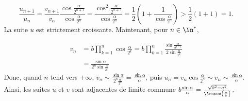 {{$$\frac{u_{n+1}}{u_n}=\frac{v_{n+1}}{v_n}\frac{\cos\frac{\alpha}{2^{n+1}}}{\cos\frac{\alpha}{2^n}}
=\frac{\cos^2\frac{\alpha}{2^{n+1}}}{\cos\frac{\alpha}{2^n}}
=\frac{1}{2}\left(1+\frac{1}{\cos\frac{\alpha}{2^n}}\right)>\frac{1}{2}(1+1)=1.
$$
La suite $u$ est strictement croissante. Maintenant, pour $n\in\Nn^*$,

\begin{align*}
v_n&=b\prod_{k=1}^{n}\cos\frac{\alpha}{2^k}=b\prod_{k=1}^{n}\frac{\sin\frac{\alpha}{2^{k-1}}}
{2\sin\frac{\alpha}{2^k}}\\
 &=\frac{\sin\alpha}{2^n\sin\frac{\alpha}{2^n}}
\end{align*}
Donc, quand $n$ tend vers $+\infty$, $v_n\sim\frac{\sin\alpha}{2^n\frac{\alpha}{2^n}}=\frac{\sin\alpha}{\alpha}$, puis $u_n=v_n\cos\frac{\alpha}{2^n}\sim v_n\sim\frac{\sin\alpha}{\alpha}$.
Ainsi, les suites $u$ et $v$ sont adjacentes de limite commune $b\frac{\sin\alpha}{\alpha}=\frac{\sqrt{b^2-a^2}}{\Arccos\left(\frac{a}{b}\right)}$.
}
}
